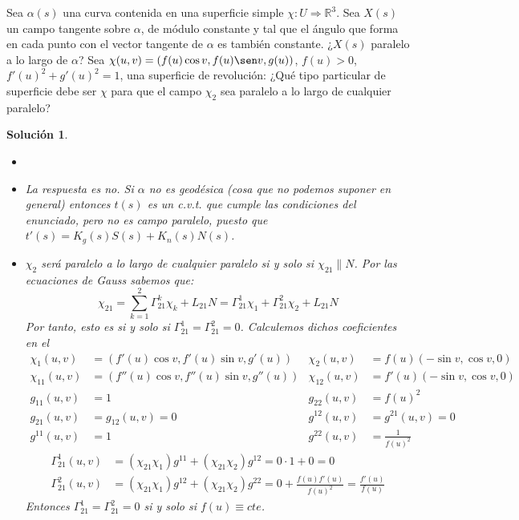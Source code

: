 \documentclass{article}
\theoremstyle{plain}
\newtheorem*{sol*}{Solución}
\newcommand{\R}{\mathbb{R}}
\newcommand{\X}{\chi}
\newenvironment{ejercicio}[2][Estado]{\begin{trivlist}
\item[\hskip \labelsep {\bfseries Ejercicio}\hskip \labelsep {\bfseries #2.}]}{\end{trivlist}}
\begin{document}
\newpage
\begin{ejercicio}{10}
Sea $\alpha(s)$ una curva contenida en una superficie simple $\X : U \Rightarrow \R^3$. Sea $X(s)$ un campo tangente sobre $\alpha$, de módulo constante y tal que el ángulo que forma en cada punto con el vector tangente de $\alpha$ es también constante. ¿$X(s)$ paralelo a lo largo de $\alpha$? Sea $\X(u, v) =( f(u) \cos v, f(u) \sen v, g(u))$, $f(u) > 0$, $f'(u)^2+ g'(u)^2 = 1$, una superficie de revolución: ¿Qué tipo particular de superficie debe ser $\X$ para que el campo $\X_2$ sea paralelo a lo largo de cualquier paralelo?
\end{ejercicio}
\begin{sol*}
\begin{itemize}
\item[]
\item La respuesta es no. Si $\alpha$ no es geodésica (cosa que no podemos suponer en general) entonces $t(s)$ es un c.v.t. que cumple las condiciones del enunciado, pero no es campo paralelo, puesto que $t'(s)=K_g(s)S(s)+K_n(s)N(s)$.
\item $\X_2$ será paralelo a lo largo de cualquier paralelo si y solo si $\X_{21} \parallel N$. Por las ecuaciones de Gauss sabemos que:
\[
\X_{21} = \sum_{k=1}^2 \Gamma_{21}^k \X_k+ L_{21}N = \Gamma_{21}^1\X_1 + \Gamma_{21}^2\X_2 + L_{21}N
\]
Por tanto, esto es si y solo si $\Gamma_{21}^1=\Gamma_{21}^2 = 0$. Calculemos dichos coeficientes en el 
\begin{align*}
\X_1(u,v) & = (f'(u)\cos v, f'(u) \sin v, g'(u)) & \X_2(u,v)& = f(u)(-\sin v, \cos v, 0)\\
\X_{11}(u,v) &=   (f''(u)\cos v, f''(u) \sin v, g''(u))                     & \X_{12}(u,v) & = f'(u)(-\sin v,\cos v, 0)      \\
g_{11}(u,v) & = 1 & g_{22}(u,v) & = f(u)^2\\
g_{21}(u,v) & = g_{12}(u,v)=0  &  g^{12}(u,v)&=g^{21}(u,v) = 0\\
g^{11}(u,v) & = 1 & g^{22}(u,v) & = \frac{1}{f(u)^2}
\end{align*}
\begin{align*}
\Gamma_{21}^1(u,v) &= (\X_{21}\X_1)g^{11} + (\X_{21}\X_2)g^{12} =0\cdot 1 + 0 = 0\\
\Gamma_{21}^2(u,v) &= (\X_{21}\X_1)g^{12} + (\X_{21}\X_2)g^{22} = 0+\frac{f(u)f'(u)}{f(u)^2}= \frac{f'(u)}{f(u)}
\end{align*}
Entonces $\Gamma_{21}^1=\Gamma_{21}^2 = 0$ si y solo si $f(u)\equiv cte$.
\end{itemize}
\end{sol*}
\end{document}
